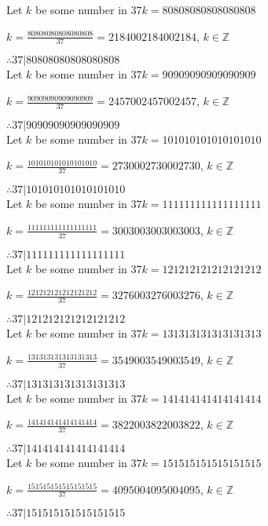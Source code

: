 \documentclass{article}
\begin{document}
Let $k$ be some number in $37k = 80808080808080808$

$k = \frac{80808080808080808}{37} = 2184002184002184$, $k \in \mathbb{Z}$

$ \therefore  37|80808080808080808 $ \\

Let $k$ be some number in $37k = 90909090909090909$

$k = \frac{90909090909090909}{37} = 2457002457002457$, $k \in \mathbb{Z}$

$ \therefore  37|90909090909090909 $ \\

Let $k$ be some number in $37k = 101010101010101010$

$k = \frac{101010101010101010}{37} = 2730002730002730$, $k \in \mathbb{Z}$

$ \therefore  37|101010101010101010 $ \\

Let $k$ be some number in $37k = 111111111111111111$

$k = \frac{111111111111111111}{37} = 3003003003003003$, $k \in \mathbb{Z}$

$ \therefore  37|111111111111111111 $ \\

Let $k$ be some number in $37k = 121212121212121212$

$k = \frac{121212121212121212}{37} = 3276003276003276$, $k \in \mathbb{Z}$

$ \therefore  37|121212121212121212 $ \\

Let $k$ be some number in $37k = 131313131313131313$

$k = \frac{131313131313131313}{37} = 3549003549003549$, $k \in \mathbb{Z}$

$ \therefore  37|131313131313131313 $ \\

Let $k$ be some number in $37k = 141414141414141414$

$k = \frac{141414141414141414}{37} = 3822003822003822$, $k \in \mathbb{Z}$

$ \therefore  37|141414141414141414 $ \\

Let $k$ be some number in $37k = 151515151515151515$

$k = \frac{151515151515151515}{37} = 4095004095004095$, $k \in \mathbb{Z}$

$ \therefore  37|151515151515151515 $ \\
\end{document}
